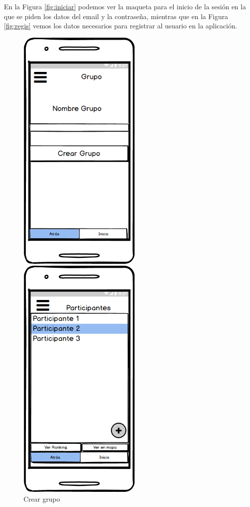 En la Figura \ref{fig:iniciar}  podemos ver la maqueta para el inicio de la sesión en la que se piden los datos del email y la contraseña, mientras que en la Figura \ref{fig:regis} vemos los datos necesarios para registrar al usuario en la aplicación.







	
	\begin{figure}[htbp]
\begin{minipage}[b]{0.5\linewidth} %
\centering
\includegraphics[width=6cm]{maqueta/Crear-Grupo.png}
\caption{Crear grupo}
\label{fig:crearg}
\end{minipage}
\hspace{0.5cm} %
\begin{minipage}[b]{0.5\linewidth}
\centering
\includegraphics[width=6cm]{maqueta/Ver-Miembros-grupo.png}


\end{minipage}
\end{figure}
